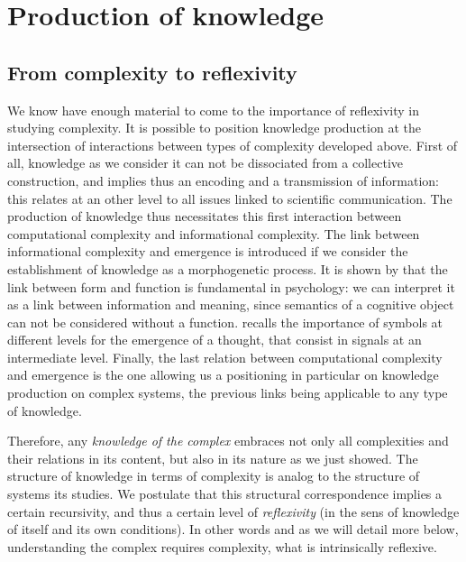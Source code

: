 \documentclass[graybox]{svmult}
\begin{document}
\section{Production of knowledge}

\subsection{From complexity to reflexivity}

We know have enough material to come to the importance of reflexivity in studying complexity. It is possible to position knowledge production at the intersection of interactions between types of complexity developed above. First of all, knowledge as we consider it can not be dissociated from a collective construction, and implies thus an encoding and a transmission of information: this relates at an other level to all issues linked to scientific communication. The production of knowledge thus necessitates this first interaction between computational complexity and informational complexity. The link between informational complexity and emergence is introduced if we consider the establishment of knowledge as a morphogenetic process. It is shown by \cite{antelope2016interdisciplinary} that the link between form and function is fundamental in psychology: we can interpret it as a link between information and meaning, since semantics of a cognitive object can not be considered without a function. \cite{hofstadter1980godel} recalls the importance of symbols at different levels for the emergence of a thought, that consist in signals at an intermediate level. Finally, the last relation between computational complexity and emergence is the one allowing us a positioning in particular on knowledge production on complex systems, the previous links being applicable to any type of knowledge.

Therefore, any \emph{knowledge of the complex} embraces not only all complexities and their relations in its content, but also in its nature as we just showed. The structure of knowledge in terms of complexity is analog to the structure of systems its studies. We postulate that this structural correspondence implies a certain recursivity, and thus a certain level of \emph{reflexivity} (in the sens of knowledge of itself and its own conditions). In other words and as we will detail more below, understanding the complex requires complexity, what is intrinsically reflexive.


%
\end{document}

